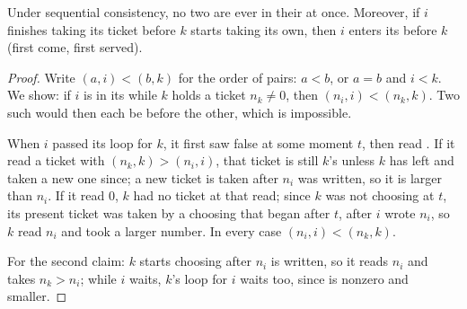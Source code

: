 \label{lst:b2:threads-and-synchronisation:bakery}

\begin{theorem}\label{thm:b2:threads-and-synchronisation:bakery}
Under sequential consistency, no two  are ever in their  at once. Moreover, if  $i$
finishes taking its ticket before  $k$ starts taking its own, then $i$ enters its  before $k$
(first come, first served).
\end{theorem}

\begin{proof}
Write $(a, i) < (b, k)$ for the order of pairs: $a < b$, or $a = b$ and $i < k$. We show: if $i$ is in its  while $k$ holds a ticket $n_k \ne 0$, then $(n_i, i) < (n_k, k)$. Two such  would then each be before
the other, which is impossible.

When $i$ passed its loop for $k$, it first saw  false at some moment $t$, then read
. If it read a ticket with $(n_k, k) > (n_i, i)$, that ticket is still $k$'s unless $k$ has left and
taken a new one since; a new ticket is taken after $n_i$ was written, so it is larger than $n_i$. If it read 0, $k$
had no ticket at that read; since $k$ was not choosing at $t$, its present ticket was taken by a choosing that began
after $t$, after $i$ wrote $n_i$, so $k$ read $n_i$ and took a larger number. In every case $(n_i, i) < (n_k, k)$.

For the second claim: $k$ starts choosing after $n_i$ is written, so it reads $n_i$ and takes $n_k > n_i$; while $i$
waits, $k$'s loop for $i$ waits too, since  is nonzero and smaller.
\end{proof}


